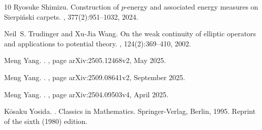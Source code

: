 \documentclass[11pt,a4paper]{article}
\numberwithin{equation}{section}
\theoremstyle{plain}
\theoremstyle{definition}
\begin{document}
\begin{thebibliography}{10}
Ryosuke Shimizu.
\newblock Construction of {$p$}-energy and associated energy measures on
  {S}ierpi\'{n}ski carpets.
, 377(2):951--1032, 2024.

Neil~S. Trudinger and Xu-Jia Wang.
\newblock On the weak continuity of elliptic operators and applications to
  potential theory.
, 124(2):369--410, 2002.

Meng {Yang}.
.
, page arXiv:2505.12468v2, May 2025.

Meng {Yang}.
.
, page arXiv:2509.08641v2, September 2025.

Meng {Yang}.
.
, page arXiv:2504.09503v4, April 2025.

K{\=o}saku Yosida.
.
\newblock Classics in Mathematics. Springer-Verlag, Berlin, 1995.
\newblock Reprint of the sixth (1980) edition.

\end{thebibliography}
\end{document}
